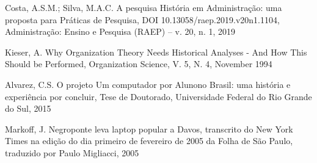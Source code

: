 \documentclass[
12pt,		%
openright,	%
twoside,  %
a4paper,			%
chapter=TITLE,		%
english,			%
french,				%
spanish,			%
brazil				%
]{USPSC-classe/USPSC}
\begin{document}
\begin{flushleft}
\begin{flushleft}
\begin{flushleft}
\begin{flushleft}
 Costa, A.S.M.; Silva, M.A.C. A pesquisa Hist\'oria em Administra\c{c}\~ao: uma proposta para Pr\'aticas de Pesquisa, DOI 10.13058/raep.2019.v20n1.1104, Administra\c{c}\~ao: Ensino e Pesquisa (RAEP) – v. 20, n. 1, 2019
\end{flushleft}


\end{flushleft}


\end{flushleft}


\end{flushleft}


\begin{flushleft}
\begin{flushleft}
\begin{flushleft}
\begin{flushleft}
[Kieser, 1994] Kieser, A. Why Organization Theory Needs Historical Analyses - And How This Should be Performed, Organization Science, V. 5, N. 4, November 1994
\end{flushleft}


\end{flushleft}


\end{flushleft}


\end{flushleft}


\begin{flushleft}
\begin{flushleft}
\begin{flushleft}
\begin{flushleft}
[ALVAREZ, 2015] Alvarez, C.S. O projeto \textquotedbl Um computador por Aluno\textquotedbl  no Brasil: uma hist\'oria e experi\^encia por concluir, Tese de Doutorado, Universidade Federal do Rio Grande do Sul, 2015
\end{flushleft}


\end{flushleft}


\end{flushleft}


\end{flushleft}


\begin{flushleft}
\begin{flushleft}
\begin{flushleft}
\begin{flushleft}
[MARKOFF, 2005] Markoff, J. Negroponte leva laptop popular a Davos, transcrito do New York Times na edi\c{c}\~ao do dia primeiro de fevereiro de 2005 da Folha de S\~ao Paulo, traduzido por Paulo Migliacci, 2005
\end{flushleft}


\end{flushleft}


\end{flushleft}


\end{flushleft}
\end{document}
